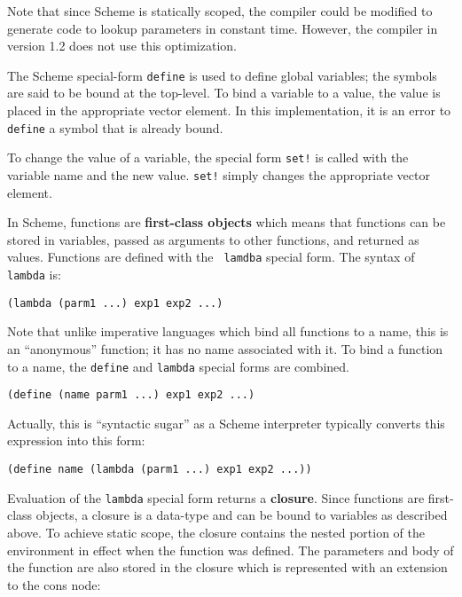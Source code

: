 	Note that since Scheme is statically scoped, the compiler could
be modified to generate code to lookup parameters in constant time.
However, the compiler in version 1.2 does not use this optimization.

	The Scheme special-form {\tt define} is used to define global
variables; the symbols are said to be bound at the top-level.  To bind a
variable to a value, the value is placed in the appropriate vector
element.  In this implementation, it is an error to {\tt define} a symbol
that is already bound.

	To change the value of a variable, the special form {\tt set!} is
called with the variable name and the new value.  {\tt set!} simply
changes the appropriate vector element.

	In Scheme, functions are {\bf first-class objects} which means
that functions can be stored in variables, passed as arguments to other
functions, and returned as values.  Functions are defined with the {\tt
lamdba} special form.  The syntax of {\tt lambda} is:

\begin{center}
	{\tt (lambda (parm1 ...) exp1 exp2 ...)}
\end{center}

	Note that unlike imperative languages which bind all functions to
a name, this is an ``anonymous'' function; it has no name associated with
it.  To bind a function to a name, the {\tt define} and {\tt lambda}
special forms are combined.

\begin{center}
	{\tt (define (name parm1 ...) exp1 exp2 ...)}
\end{center}

	Actually, this is ``syntactic sugar'' as a Scheme interpreter
typically converts this expression into this form:

\begin{center}
	{\tt (define name (lambda (parm1 ...) exp1 exp2 ...))}
\end{center}

	Evaluation of the {\tt lambda} special form returns a {\bf
closure}.  Since functions are first-class objects, a closure is a
data-type and can be bound to variables as described above.  To achieve
static scope, the closure contains the nested portion of the environment
in effect when the function was defined.  The parameters and body of the
function are also stored in the closure which is represented with an
extension to the cons node:


